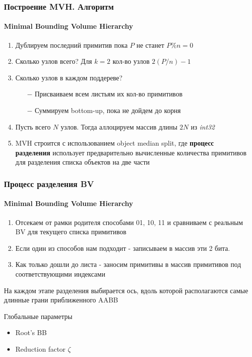 \documentclass{beamer}
\begin{document}
\begin{frame}
    \frametitle{Построение MVH. Алгоритм}
    \framesubtitle{Minimal Bounding Volume Hierarchy}
    \begin{enumerate}
        \item
            Дублируем последний примитив пока $P$ не станет $ P \% n = 0$
        \item
            Сколько узлов всего? Для $k = 2$ кол-во узлов $2(P/n) -1$
        \item
            Сколько узлов в каждом поддереве?
            \begin{itemize}
                \item[$-$]
                    Присваиваем всем листьям их кол-во примитивов
                \item[$-$]
                    Суммируем bottom-up, пока не дойдем до корня
            \end{itemize}
        \item
            Пусть всего $N$ узлов. Тогда аллоцируем массив длины $2N$ из \textit{int32}
        \item
            MVH строится с использованием object median split, где
            \textbf{процесс разделения} использует предварительно вычисленные количества примитивов для
            разделения списка объектов на две части
    \end{enumerate}
\end{frame}

\begin{frame}
    \frametitle{Процесс разделения BV}
    \framesubtitle{Minimal Bounding Volume Hierarchy}
    \begin{enumerate}
        \item
            Отсекаем от рамки родителя способами 01, 10, 11 и сравниваем с реальным BV для текущего списка примитивов
        \item
            Если один из способов нам подходит - записываем в массив эти 2 бита.
        \item
            Как только дошли до листа - заносим примитивы в массив примитивов под соответствующими индексами
    \end{enumerate}
    \begin{block}{}
        На каждом этапе разделения выбирается ось, вдоль которой располагаются самые длинные грани приближенного AABB
    \end{block}
    \begin{block}{Глобальные параметры}
        \begin{itemize}
            \item
                Root's BB
            \item
                Reduction factor $\zeta$
        \end{itemize}
    \end{block}
\end{frame}
\end{document}
